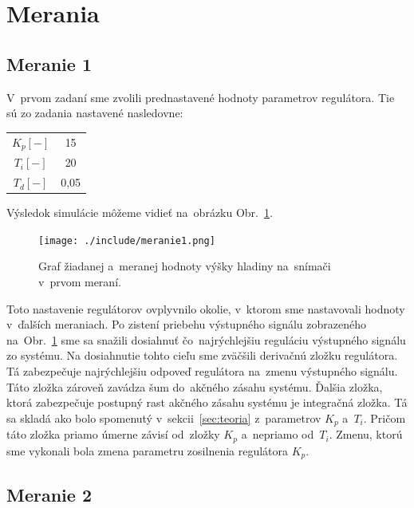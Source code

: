 \documentclass{article}
\begin{document}
\section{Merania}
\label{sec:merania}

\subsection{Meranie 1}
\label{sec:meranie1}

V~prvom zadaní sme zvolili prednastavené hodnoty parametrov regulátora. Tie sú zo zadania nastavené nasledovne:

\begin{center}
\begin{tabular}{ |c|c| }
 \hline
 $K_p [-]$ & 15 \\
 $T_i [-]$ & 20 \\
 $T_d [-]$ & 0,05 \\
 \hline
\end{tabular}
\end{center}

Výsledok simulácie môžeme vidieť na~obrázku Obr.~\ref{fig:m1}.

\begin{figure}[!htbp]
	\begin{center}
		\texttt{[image: ./include/meranie1.png]}
	\end{center}
	\caption{Graf žiadanej a~meranej hodnoty výšky hladiny na~snímači v~prvom meraní.}
	\label{fig:m1}
\end{figure}


Toto nastavenie regulátorov ovplyvnilo okolie, v~ktorom sme nastavovali hodnoty v~ďalších meraniach. Po zistení
priebehu výstupného signálu zobrazeného na~Obr.~\ref{fig:m1} sme sa snažili dosiahnuť čo~najrýchlejšiu reguláciu
výstupného signálu zo systému. Na dosiahnutie tohto cieľu sme zväčšili derivačnú zložku regulátora.
Tá zabezpečuje najrýchlejšiu odpoveď regulátora na~zmenu výstupného signálu. Táto zložka zároveň zavádza šum
do~akčného zásahu systému. Ďalšia zložka, ktorá zabezpečuje postupný rast akčného zásahu systému je integračná
zložka. Tá sa skladá ako bolo spomenutý v~sekcii~\ref{sec:teoria} z~parametrov $K_p$ a~$T_i$. Pričom táto zložka
priamo úmerne závisí od~zložky $K_p$ a~nepriamo od~$T_i$. Zmenu, ktorú sme vykonali bola zmena parametru
zosilnenia regulátora $K_p$.


\clearpage

\subsection{Meranie 2}
\label{sec:meranie2}
\end{document}
